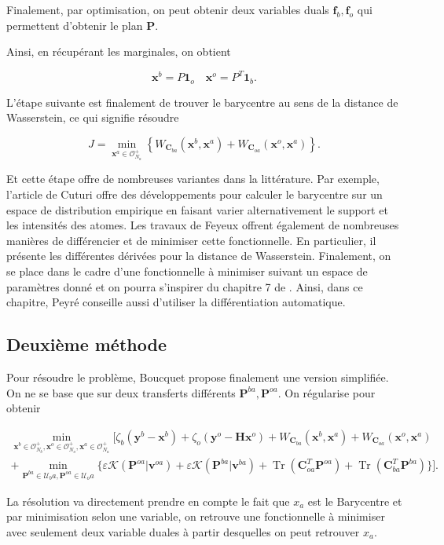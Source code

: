 \documentclass{article}
\newcommand{\bH}{\bm{H}}
\newcommand{\bbf}{\bm{f}}
\newcommand{\bC}{\bm{C}}
\newcommand{\bx}{\bm{x}}
\newcommand{\bP}{\bm{P}}
\newcommand{\by}{\bm{y}}
\newcommand{\bv}{\bm{v}}
\DeclareMathOperator{\Tr}{Tr}
\begin{document}
Finalement, par optimisation, on peut obtenir deux variables duals $\bbf_b, \bbf_o$ qui permettent d'obtenir le plan $\bP$.

Ainsi, en récupérant les marginales, on obtient

$$
    \bx^b = P \bm{1}_o \quad \bx^o = P^T \bm{1}_b.
$$

L'étape suivante est finalement de trouver le barycentre au sens de la distance de Wasserstein, ce qui signifie résoudre

$$
    J = \min_{\bx^a \in \mathcal O^+_{N_a}} \left\{W_{\bC_{ba}}(\bx^b, \bx^a) + W_{\bC_{oa}}(\bx^o, \bx^a)\right\}.
$$

Et cette étape offre de nombreuses variantes dans la littérature. Par exemple, l'article de Cuturi \cite{cuturi_fast_2014} offre des développements pour calculer le barycentre sur un espace de distribution empirique en faisant varier alternativement le support et les intensités des atomes. Les travaux de Feyeux \cite{feyeux_transport_nodate} offrent également de nombreuses manières de différencier et de minimiser cette fonctionnelle. En particulier, il présente les différentes dérivées pour la distance de Wasserstein.
Finalement, on se place dans le cadre d'une fonctionnelle à minimiser suivant un espace de paramètres donné et on pourra s'inspirer du chapitre 7 de \cite{peyre_computational_2020}. Ainsi, dans ce chapitre, Peyré conseille aussi d'utiliser la différentiation automatique.

\subsection{Deuxième méthode}

Pour résoudre le problème, Boucquet propose finalement une version simplifiée. On ne se base que sur deux transferts différents $\bP^{ba}, \bP^{oa}$.
On régularise pour obtenir

\begin{eqnarray*}
    \min_{\bx^b \in \mathcal O_{N_b}^+, \bx^o \in \mathcal O_{N_o}^+, \bx^a \in \mathcal O_{N_a}^+} [\zeta_b(\by^b - \bx^b) + \zeta_o(\by^o - \bH \bx^o) + W_{\bC_{ba}}(\bx^b, \bx^a) + W_{\bC_{oa}}(\bx^o, \bx^a) \\
        + \min_{\bP^{ba} \in \mathcal{U}_ba, \bP^{oa} \in \mathcal{U}_oa} \{\varepsilon \mathcal K (\bP^{oa}|\bv^{oa}) + \varepsilon \mathcal K (\bP^{ba}|\bv^{ba}) + \Tr(\bC_{oa}^T \bP^{oa}) + \Tr(\bC_{ba}^T \bP^{ba})\}].
\end{eqnarray*}


La résolution va directement prendre en compte le fait que $x_a$ est le Barycentre et par minimisation selon une variable, on retrouve une fonctionnelle à minimiser avec seulement deux variable duales à partir desquelles on peut retrouver $x_a$.
\end{document}
